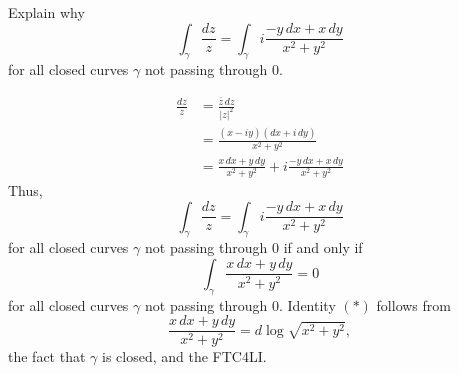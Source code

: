 \documentclass[12pt]{exam}
\begin{document}
\begin{questions}
\question
Explain why
\[
    \int_\gamma \frac{dz}{z} = \int_\gamma i\frac{-y\,dx + x\,dy}{x^2+y^2}
\]
for all closed curves $\gamma$ not passing through $0$.

\begin{solution}
\begin{align*}
    \frac{dz}z &= \frac{\bar z\,dz}{|z|^2}\\
    &= \frac{(x-iy)(dx + i\,dy)}{x^2+y^2}\\
    &= \frac{x\,dx + y\,dy}{x^2+y^2} + i\frac{-y\,dx + x\,dy}{x^2+y^2}
\end{align*}
Thus,
\[
    \int_\gamma \frac{dz}{z} = \int_\gamma i\frac{-y\,dx + x\,dy}{x^2+y^2}
\]
for all closed curves $\gamma$ not passing through $0$ if and only if
\[
    \int_\gamma\frac{x\,dx + y\,dy}{x^2+y^2}=0\tag{$*$}
\]
for all closed curves $\gamma$ not passing through $0$. Identity $(*)$ follows from
\[
    \frac{x\,dx + y\,dy}{x^2+y^2} = d\log\sqrt{x^2+y^2},
\]
the fact that $\gamma$ is closed, and the FTC4LI.
\end{solution}







\end{questions}
\end{document}
